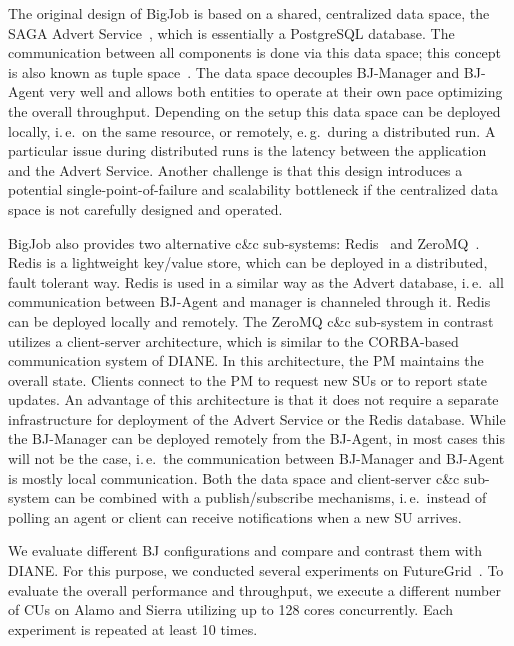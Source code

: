 \documentclass[conference,final]{IEEEtran}
\newcommand{\jhanote}[1]{ {\textcolor{red} { ***shantenu: #1 }}}
\newcommand{\alnote}[1]{ {\textcolor{blue} { ***andrel: #1 }}}
\newcommand{\alnote}[1]{}
\newcommand{\jhanote}[1]{}
\newcommand{\cu}{CU\xspace}
\newcommand{\cus}{CUs\xspace}
\begin{document}
The original design of BigJob is based on a shared, centralized data
space, the SAGA Advert Service~\cite{saga_advert}, which is
essentially a PostgreSQL database. The communication between all
components is done via this data space; this concept is also known as
tuple space~\cite{Gelernter:1985:GCL:2363.2433}.  The data space
decouples BJ-Manager and BJ-Agent very well and allows both entities
to operate at their own pace optimizing the overall throughput.
Depending on the setup this data space can be deployed locally,
i.\,e.\ on the same resource, or remotely, e.\,g.\ during a
distributed run. A particular issue during distributed runs is the
latency between the application and the Advert Service. Another
challenge is that this design introduces a potential
single-point-of-failure and scalability bottleneck if the centralized
data space is not carefully designed and operated.


BigJob also provides two alternative c\&c sub-systems:
Redis~\cite{redis} and ZeroMQ~\cite{zmq}. Redis is a lightweight
key/value store, which can be deployed in a distributed, fault
tolerant way. Redis is used in a similar way as the Advert database,
i.\,e.\ all communication between BJ-Agent and manager is channeled
through it. Redis can be deployed locally and remotely.  The ZeroMQ
c\&c sub-system in contrast utilizes a client-server architecture,
which is similar to the CORBA-based~\cite{OMG-CORBA303:2004}
communication system of DIANE. In this architecture, the PM maintains
the overall state. Clients connect to the PM to request new SUs or to
report state updates. An advantage of this architecture is that it
does not require a separate infrastructure for deployment of the
Advert Service or the Redis database. While the BJ-Manager can be
deployed remotely from the BJ-Agent, in most cases this will not be
the case, i.\,e.\ the communication between BJ-Manager and BJ-Agent is
mostly local communication. Both the data space and client-server c\&c
sub-system can be combined with a publish/subscribe mechanisms,
i.\,e.\ instead of polling an agent or client can receive
notifications when a new SU arrives. 

We evaluate different BJ configurations and compare and contrast them
with DIANE. For this purpose, we conducted several experiments on
FutureGrid~\cite{fg}. To evaluate the overall performance and
throughput, we execute a different number of \cus on Alamo and Sierra
utilizing up to 128 cores concurrently. Each experiment is repeated at
least 10 times.

\end{document}
